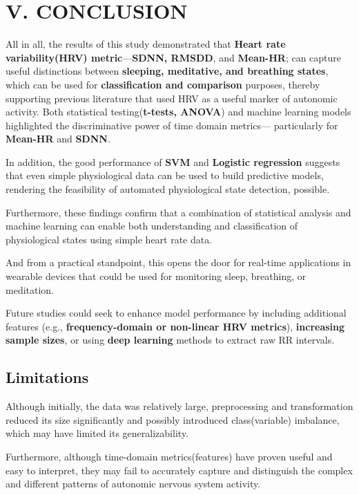 \documentclass[
  11pt,
]{ieee}
\begin{document}
\section{V. CONCLUSION}\label{v.-conclusion}

All in all, the results of this study demonstrated that \textbf{Heart
rate variability(HRV) metric}---\textbf{SDNN, RMSDD}, and
\textbf{Mean-HR}; can capture useful distinctions between
\textbf{sleeping, meditative, and breathing states}, which can be used
for \textbf{classification and comparison} purposes, thereby supporting
previous literature that used HRV as a useful marker of autonomic
activity. Both statistical testing(\textbf{t-tests, ANOVA}) and machine
learning models highlighted the discriminative power of time domain
metrics--- particularly for \textbf{Mean-HR} and \textbf{SDNN}.

In addition, the good performance of \textbf{SVM} and \textbf{Logistic
regression} suggests that even simple physiological data can be used to
build predictive models, rendering the feasibility of automated
physiological state detection, possible.

Furthermore, these findings confirm that a combination of statistical
analysis and machine learning can enable both understanding and
classification of physiological states using simple heart rate data.

And from a practical standpoint, this opens the door for real-time
applications in wearable devices that could be used for monitoring
sleep, breathing, or meditation.

Future studies could seek to enhance model performance by including
additional features (e.g., \textbf{frequency-domain or non-linear HRV
metrics}), \textbf{increasing sample sizes}, or using \textbf{deep
learning} methods to extract raw RR intervals.

\subsection{Limitations}\label{limitations}

\vspace{0.8em}

Although initially, the data was relatively large, preprocessing and
transformation reduced its size significantly and possibly introduced
class(variable) imbalance, which may have limited its generalizability.

Furthermore, although time-domain metrics(features) have proven useful
and easy to interpret, they may fail to accurately capture and
distinguish the complex and different patterns of autonomic nervous
system activity.
\end{document}
